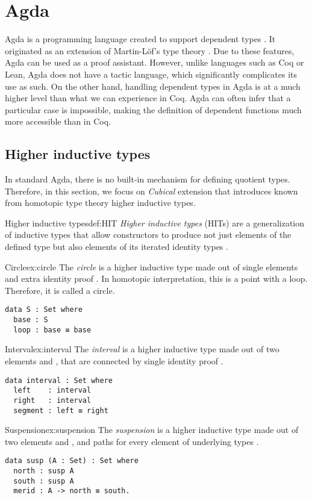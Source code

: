 \section{Agda}
Agda is a programming language created to support dependent types \cite{agda}. It originated as an extension of Martin-Löf's type theory \cite{MARTINLOF197573}. Due to these features, Agda can be used as a proof assistant. However, unlike languages such as Coq or Lean, Agda does not have a tactic language, which significantly complicates its use as such. On the other hand, handling dependent types in Agda is at a much higher level than what we can experience in Coq. Agda can often infer that a particular case is impossible, making the definition of dependent functions much more accessible than in Coq.
\subsection{Higher inductive types}
In standard Agda, there is no built-in mechanism for defining quotient types. Therefore, in this section, we focus on \emph{Cubical} extension that introduces known from homotopic type theory higher inductive types.
\begin{defi}{Higher inductive types}{def:HIT}
\emph{Higher inductive types} (HITs) are a generalization of inductive types that allow constructors to produce not just elements of the defined type but also elements of its iterated identity types \cite{HoTT}.
\end{defi}
\begin{example}{Circle}{ex:circle}
The \emph{circle} is a higher inductive type made out of single elements  and extra identity proof  \cite{HoTT}. In homotopic interpretation, this is a point with a loop. Therefore, it is called a circle.
\begin{verbatim}
data S : Set where
  base : S
  loop : base ≡ base
\end{verbatim}
\end{example}
\begin{example}{Interval}{ex:interval}
The \emph{interval} is a higher inductive type made out of two elements  and , that are connected by single identity proof  \cite{HoTT}.
\begin{verbatim}
data interval : Set where
  left    : interval
  right   : interval
  segment : left ≡ right
\end{verbatim}
\end{example}
\begin{example}{Suspension}{ex:suspension}
The \emph{suspension} is a higher inductive type made out of two elements  and , and paths for every element of underlying types \cite{HoTT}.
\begin{verbatim}
data susp (A : Set) : Set where
  north : susp A
  south : susp A
  merid : A -> north ≡ south.
\end{verbatim}
\end{example}
